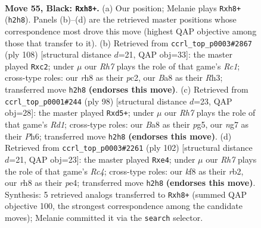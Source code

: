 \documentclass[11pt]{article}
\begin{document}
\clearpage

\begin{figure}[p]\centering
\begin{subfigure}{0.46\textwidth}\centering
\resizebox{\linewidth}{!}{%
\newchessgame
\chessboard[
  setfen={b4K1R/P4pN1/2k5/4P3/8/8/5p1r/8 b - - 0 55},
  showmover=false,
  pgfstyle=straightmove, color=movearrow, markmove={h2-h8}
]}
\caption{}
\end{subfigure}\hfill
\begin{subfigure}{0.46\textwidth}\centering
\resizebox{\linewidth}{!}{%
\newchessgame
\chessboard[
  setfen={8/8/6k1/1bB2n2/3Pr3/7R/2p5/2R3K1 w - - 4 55},
  showmover=false,
  pgfstyle=straightmove, color=movearrow, markmove={c1-c2}
]}
\caption{}
\end{subfigure}
\\[4pt]
\begin{subfigure}{0.46\textwidth}\centering
\resizebox{\linewidth}{!}{%
\newchessgame
\chessboard[
  setfen={8/7p/7P/3rk1p1/8/PK6/8/3R4 w - - 0 50},
  showmover=false,
  pgfstyle=straightmove, color=movearrow, markmove={d1-d5}
]}
\caption{}
\end{subfigure}\hfill
\begin{subfigure}{0.46\textwidth}\centering
\resizebox{\linewidth}{!}{%
\newchessgame
\chessboard[
  setfen={8/7k/6p1/5nB1/2R1p3/7P/1rP5/6K1 w - - 1 52},
  showmover=false,
  pgfstyle=straightmove, color=movearrow, markmove={c4-e4}
]}
\caption{}
\end{subfigure}
\caption{\textbf{Move 55, Black: \texttt{Rxh8+}.} (a) Our position; Melanie plays \texttt{Rxh8+} (\texttt{h2h8}). Panels (b)--(d) are the retrieved master positions whose correspondence most drove this move (highest QAP objective among those that transfer to it). (b) Retrieved from \texttt{ccrl\_top\_p0003\#2867} (ply 108) [structural distance $d$=21, QAP obj=33]: the master played \texttt{Rxc2}; under $\mu$ our \emph{Rh7} plays the role of that game's \emph{Rc1}; cross-type roles: our \emph{r}h8 as their \emph{p}c2, our \emph{B}a8 as their \emph{R}h3; transferred move \texttt{h2h8} \textbf{(endorses this move)}. (c) Retrieved from \texttt{ccrl\_top\_p0001\#244} (ply 98) [structural distance $d$=23, QAP obj=28]: the master played \texttt{Rxd5+}; under $\mu$ our \emph{Rh7} plays the role of that game's \emph{Rd1}; cross-type roles: our \emph{B}a8 as their \emph{p}g5, our \emph{n}g7 as their \emph{P}h6; transferred move \texttt{h2h8} \textbf{(endorses this move)}. (d) Retrieved from \texttt{ccrl\_top\_p0003\#2261} (ply 102) [structural distance $d$=21, QAP obj=23]: the master played \texttt{Rxe4}; under $\mu$ our \emph{Rh7} plays the role of that game's \emph{Rc4}; cross-type roles: our \emph{k}f8 as their \emph{r}b2, our \emph{r}h8 as their \emph{p}e4; transferred move \texttt{h2h8} \textbf{(endorses this move)}. Synthesis: 5 retrieved analogs transferred to \texttt{Rxh8+} (summed QAP objective 100, the strongest correspondence among the candidate moves); Melanie committed it via the \texttt{search} selector.}
\label{fig:thought-m109}
\end{figure}
\end{document}
